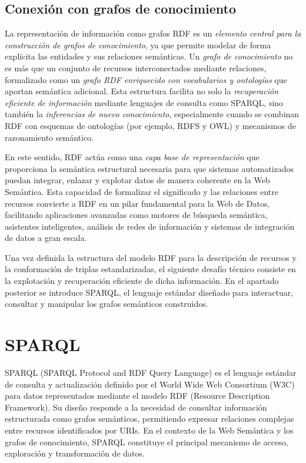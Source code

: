 \documentclass{article}
\begin{document}
\subsection{Conexión con grafos de conocimiento}

La representación de información como grafos RDF es un \textit{elemento central para la construcción de grafos de conocimiento}, ya que permite modelar de forma explícita las entidades y sus relaciones semánticas. Un \textit{grafo de conocimiento} no es más que un conjunto de recursos interconectados mediante relaciones, formalizado como un \textit{grafo RDF enriquecido con vocabularios y ontologías} que aportan semántica adicional. Esta estructura facilita no solo la \textit{recuperación eficiente de información} mediante lenguajes de consulta como SPARQL, sino también la \textit{inferencias de nuevo conocimiento}, especialmente cuando se combinan RDF con esquemas de ontologías (por ejemplo, RDFS y OWL) y mecanismos de razonamiento semántico.


En este sentido, RDF actúa como una \textit{capa base de representación} que proporciona la semántica estructural necesaria para que sistemas automatizados puedan integrar, enlazar y explotar datos de manera coherente en la Web Semántica. Esta capacidad de formalizar el significado y las relaciones entre recursos convierte a RDF en un pilar fundamental para la Web de Datos, facilitando aplicaciones avanzadas como motores de búsqueda semántica, asistentes inteligentes, análisis de redes de información y sistemas de integración de datos a gran escala.

Una vez definida la estructura del modelo RDF para la descripción de recursos y la conformación de triplas estandarizadas, el siguiente desafío técnico consiste en la explotación y recuperación eficiente de dicha información. En el apartado posterior se introduce SPARQL, el lenguaje estándar diseñado para interactuar, consultar y manipular los grafos semánticos construidos.

\section{SPARQL}

SPARQL (SPARQL Protocol and RDF Query Language) es el lenguaje estándar de consulta y actualización definido por el World Wide Web Consortium (W3C) para datos representados mediante el modelo RDF (Resource Description Framework). Su diseño responde a la necesidad de consultar información estructurada como grafos semánticos, permitiendo expresar relaciones complejas entre recursos identificados por URIs. En el contexto de la Web Semántica y los grafos de conocimiento, SPARQL constituye el principal mecanismo de acceso, exploración y transformación de datos.
\end{document}
